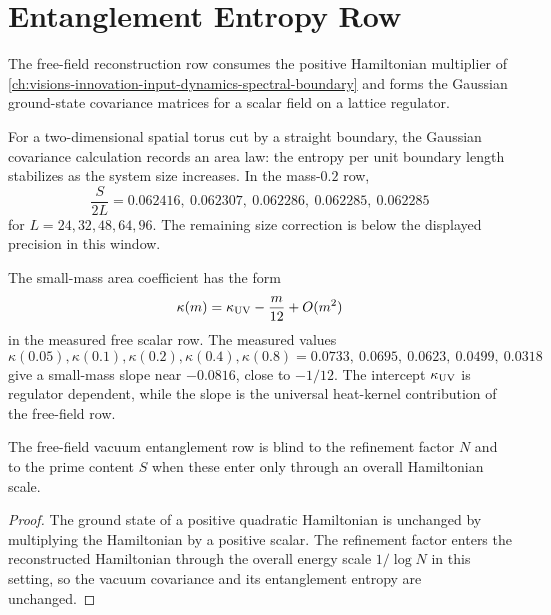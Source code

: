 \section{Entanglement Entropy Row}
\label{sec:innovation-input-thermo-entanglement-row}

\begin{definition}
\label{def:innovation-input-thermo-free-field-row}
The free-field reconstruction row consumes the positive Hamiltonian
multiplier of \autoref{ch:visions-innovation-input-dynamics-spectral-boundary}
and forms the Gaussian ground-state covariance matrices for a scalar field
on a lattice regulator.
\end{definition}

\begin{principle}
\label{prin:innovation-input-thermo-area-law-witness}
For a two-dimensional spatial torus cut by a straight boundary, the
Gaussian covariance calculation records an area law: the entropy per unit
boundary length stabilizes as the system size increases. In the
mass-$0.2$ row,
$$
\frac{S}{2L}
=
0.062416,\ 0.062307,\ 0.062286,\ 0.062285,\ 0.062285
$$
for $L=24,32,48,64,96$. The remaining size correction is below the
displayed precision in this window.
\end{principle}

\begin{principle}
\label{prin:innovation-input-thermo-universal-massive-slope}
The small-mass area coefficient has the form
$$
\kappa(m)=\kappa_{\rm UV}-\frac{m}{12}+O(m^2)
$$
in the measured free scalar row. The measured values
$$
\kappa(0.05),\kappa(0.1),\kappa(0.2),\kappa(0.4),\kappa(0.8)
=
0.0733,\ 0.0695,\ 0.0623,\ 0.0499,\ 0.0318
$$
give a small-mass slope near $-0.0816$, close to $-1/12$. The intercept
$\kappa_{\rm UV}$ is regulator dependent, while the slope is the universal
heat-kernel contribution of the free-field row.
\end{principle}

\begin{theorem}
\label{thm:innovation-input-thermo-entanglement-arithmetic-blindness}
The free-field vacuum entanglement row is blind to the refinement factor
$N$ and to the prime content $S$ when these enter only through an overall
Hamiltonian scale.
\end{theorem}

\begin{proof}
The ground state of a positive quadratic Hamiltonian is unchanged by
multiplying the Hamiltonian by a positive scalar. The refinement factor
enters the reconstructed Hamiltonian through the overall energy scale
$1/\log N$ in this setting, so the vacuum covariance and its entanglement
entropy are unchanged.
\end{proof}

